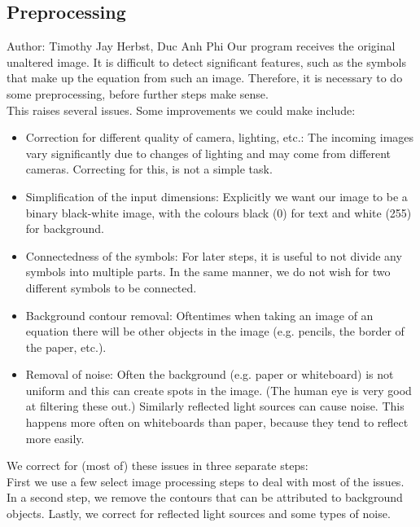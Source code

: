 \documentclass[11pt]{article}
\begin{document}
	\subsection{Preprocessing}
	\small{Author: Timothy Jay Herbst, Duc Anh Phi} \newline \newline
	Our program receives the original unaltered image.
	It is difficult to detect significant features, such as the symbols that make up the equation from such an image.
	Therefore, it is necessary to do some preprocessing, before further steps make sense.\\
	This raises several issues.
	Some improvements we could make include:\\
	\begin{itemize}
		\item Correction for different quality of camera, lighting, etc.:
		The incoming images vary significantly due to changes of lighting and may come from different cameras.
		Correcting for this, is not a simple task.
		\item Simplification of the input dimensions: Explicitly we want our image to be a binary black-white image, with the colours black (0) for text and white (255) for background.
		\item Connectedness of the symbols: For later steps, it is useful to not divide any symbols into multiple parts. In the same manner, we do not wish for two different symbols to be connected.
		\item Background contour removal: Oftentimes when taking an image of an equation there will be other objects in the image (e.g. pencils, the border of the paper, etc.).
		\item Removal of noise: Often the background (e.g. paper or whiteboard) is not uniform and this can create spots in the image. (The human eye is very good at filtering these out.)
		Similarly reflected light sources can cause noise.
		This happens more often on whiteboards than paper, because they tend to reflect more easily. %
	\end{itemize}
		We correct for (most of) these issues in three separate steps:\\
		First we use a few select image processing steps to deal with most of the issues.
		In a second step, we remove the contours that can be attributed to background objects.
		Lastly, we correct for reflected light sources and some types of noise.
\end{document}

